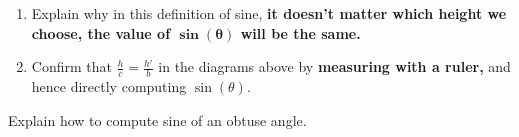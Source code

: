 \documentclass[noauthor,nooutcomes,hints,handout,12pt]{ximera}
\begin{document}
\begin{question}
\begin{enumerate}
\begin{center}
      \end{center}
      
     \item       
       Explain why in this definition of sine, \textbf{it doesn't matter which
         height we choose, the value of $\boldsymbol{\sin(\theta)}$ will be the same.}

     \item Confirm that $\frac{h}{c} = \frac{h'}{b}$ in the diagrams
       above by \textbf{measuring with a ruler,} and hence directly computing
       $\sin(\theta)$.
        \end{enumerate}
\end{question}

\mynewpage

\begin{question}
  Explain how to compute sine of an obtuse angle.
\end{question}
\end{document}

